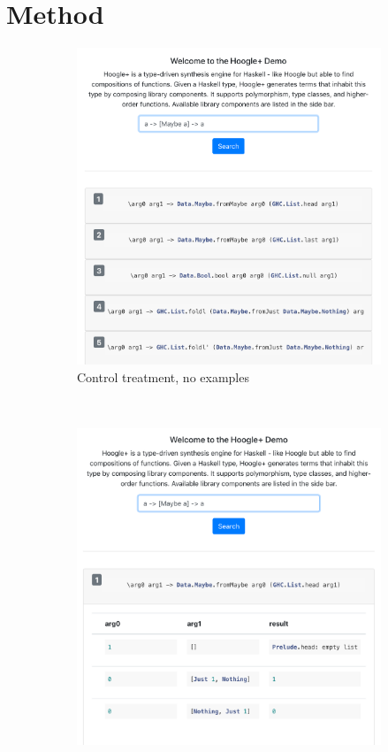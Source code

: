 \section{Method}
\begin{figure}[t!]
    \centering
    \begin{subfigure}[t]{0.5\textwidth}
        \centering
        \includegraphics[width=\textwidth]{method/control-ui.png}
        \caption{Control treatment, no examples}
    \end{subfigure}%
    ~
    \begin{subfigure}[t]{0.5\textwidth}
        \centering
        \includegraphics[width=\textwidth]{method/treatment-ui.png}

\end{subfigure}
\end{figure}
